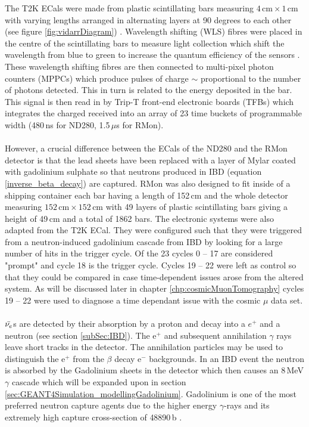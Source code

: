 The T2K ECals were made from plastic scintillating bars measuring $4\,\textrm{cm}\times1\,\textrm{cm}$ with varying lengths arranged in alternating layers at 90 degrees to each other (see figure \ref{fig:vidarrDiagram}) \cite{Allan_2013}. Wavelength shifting (WLS) fibres were placed in the centre of the scintillating bars to measure light collection which shift the wavelength from blue to green to increase the quantum efficiency of the sensors \cite{Allan_2013}. These wavelength shifting fibres are then connected to multi-pixel photon counters (MPPCs) which produce pulses of charge $\sim$ proportional to the number of photons detected. This in turn is related to the energy deposited in the bar. This signal is then read in by Trip-T front-end electronic boards (TFBs) which integrates the charged received into an array of 23 time buckets of programmable width (480\,ns for ND280, 1.5\,$\mu$s for RMon). 
\\\\However, a crucial difference between the ECals of the ND280 and the RMon detector is that the lead sheets have been replaced with a layer of Mylar coated with gadolinium sulphate so that neutrons produced in IBD (equation \ref{inverse_beta_decay}) are captured. RMon was also designed to fit inside of a shipping container each bar having a length of 152\,cm and the whole detector measuring $152\,\textrm{cm}\times152\,\textrm{cm}$ with 49 layers of plastic scintillating bars giving a height of 49\,cm and a total of 1862 bars. The electronic systems were also adapted from the T2K ECal. They were configured such that they were triggered from a neutron-induced gadolinium cascade from IBD by looking for a large number of hits in the trigger cycle. Of the 23 cycles 0 -- 17 are considered "prompt" and cycle 18 is the trigger cycle. Cycles 19 -- 22 were left as control so that they could be compared in case time-dependent issues arose from the altered system. As will be discussed later in chapter \ref{chp:cosmicMuonTomography} cycles 19 -- 22 were used to diagnose a time dependant issue with the cosmic $\mu$ data set.
\\\\$\Bar{\nu_e}$s are detected by their absorption by a proton and decay into a $e^+$ and a neutron (see section \ref{subSec:IBD}). The e$^+$ and subsequent annihilation $\gamma$ rays leave short tracks in the detector. The annihilation particles may be used to distinguish the e$^+$ from the $\beta$ decay e$^-$ backgrounds. In an IBD event the neutron is absorbed by the Gadolinium sheets in the detector which then causes an 8\,MeV $\gamma$ cascade which will be expanded upon in section \ref{sec:GEANT4Simulation_modellingGadolinium}. Gadolinium is one of the most preferred neutron capture agents due to the higher energy $\gamma$-rays and its extremely high capture cross-section of 48890\,b \cite{gadFoilsThermalNeut}. 

